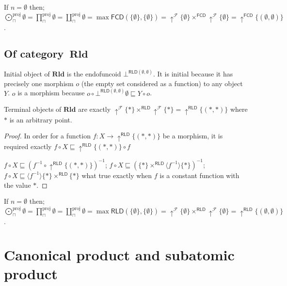 If $n = \emptyset$ then; $\bigodot^{\text{proj}}_{\sqcap} \emptyset = \prod^{\text{proj}}_{\sqcap} \emptyset = \coprod^{\text{proj}}_{\sqcap} \emptyset = \max
\mathsf{FCD} (\{\emptyset\}, \{\emptyset\}) = \uparrow^{\mathscr{F}} \{ \emptyset \}
\times^{\mathsf{FCD}} \uparrow^{\mathscr{F}} \{ \emptyset \} =
\uparrow^{\mathsf{FCD}} \{ (\emptyset , \emptyset) \}$.

\subsection{Of category~$\mathbf{Rld}$}

Initial object of $\mathbf{Rld}$ is the endofuncoid
$\bot^{\mathsf{RLD} (\emptyset , \emptyset)}$. It is
initial because it has precisely one morphism $o$ (the empty set considered as
a function) to any object $Y$. $o$ is a morphism because $o \circ
\bot^{\mathsf{RLD} (\emptyset , \emptyset)} \emptyset \sqsubseteq Y
\circ o$.

\begin{prop}
  Terminal objects of $\mathbf{Rld}$ are exactly
  $\uparrow^{\mathscr{F}} \{ \ast \} \times^{\mathsf{RLD}}
  \uparrow^{\mathscr{F}} \{ \ast \} = \uparrow^{\mathsf{RLD}} \{ (\ast
  , \ast) \}$ where $\ast$ is an arbitrary point.
\end{prop}

\begin{proof}
  In order for a function $f : X \rightarrow \uparrow^{\mathsf{RLD}} \{
  (\ast , \ast) \}$ be a morphism, it is required exactly $f \circ X
  \sqsubseteq \uparrow^{\mathsf{RLD}} \{ (\ast , \ast) \} \circ f$
  
  $f \circ X \sqsubseteq (f^{- 1} \circ \uparrow^{\mathsf{RLD}} \{
  (\ast , \ast) \})^{- 1}$; $f \circ X \sqsubseteq (\{ \ast \}
  \times^{\mathsf{RLD}} \langle f^{- 1} \rangle \{ \ast \})^{- 1}$; $f
  \circ X \sqsubseteq \langle f^{- 1} \rangle \{ \ast \}
  \times^{\mathsf{RLD}} \{ \ast \}$ what true exactly when $f$ is a
  constant function with the value $\ast$.
\end{proof}

If $n = \emptyset$ then; $\bigodot^{\text{proj}}_{\sqcap} \emptyset = \prod^{\text{proj}}_{\sqcap} \emptyset = \coprod^{\text{proj}}_{\sqcap} \emptyset = \max
\mathsf{RLD} (\{\emptyset\}, \{\emptyset\}) = \uparrow^{\mathscr{F}} \{ \emptyset \}
\times^{\mathsf{RLD}} \uparrow^{\mathscr{F}} \{ \emptyset \} =
\uparrow^{\mathsf{RLD}} \{ (\emptyset , \emptyset) \}$.

\section{Canonical product and subatomic product}

